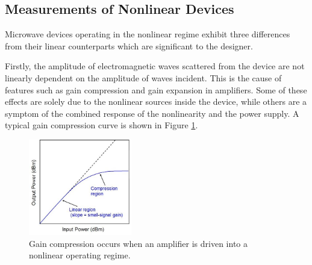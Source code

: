 \documentclass[../thesis/thesis.tex]{subfiles}
\begin{document}
\begin{refsection}
\section{Measurements of Nonlinear Devices}

Microwave devices operating in the nonlinear regime exhibit three differences from their linear counterparts which are significant to the designer.

Firstly, the amplitude of electromagnetic waves scattered from the device are not linearly dependent on the amplitude of waves incident. This is the cause of features such as gain compression and gain expansion in amplifiers. Some of these effects are solely due to the nonlinear sources inside the device, while others are a symptom of the combined response of the nonlinearity and the power supply. A typical gain compression curve is shown in Figure \ref{ch2_fig_comp}.

\begin{figure}
	\centering
	\includegraphics[width=0.4\textwidth]{ch2_comp}
	\caption{Gain compression occurs when an amplifier is driven into a nonlinear operating regime.}
	\label{ch2_fig_comp}
\end{figure}


\end{refsection}
\end{document}
